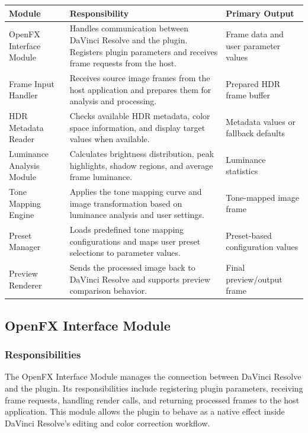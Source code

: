 \documentclass[12pt,hyphens]{article}
\begin{document}
\begin{longtable}{|p{4cm}|p{5.5cm}|p{5.5cm}|}
\hline
\textbf{Module} & \textbf{Responsibility} & \textbf{Primary Output} \\
\hline
OpenFX Interface Module & Handles communication between DaVinci Resolve and the plugin. Registers plugin parameters and receives frame requests from the host. & Frame data and user parameter values \\
\hline
Frame Input Handler & Receives source image frames from the host application and prepares them for analysis and processing. & Prepared HDR frame buffer \\
\hline
HDR Metadata Reader & Checks available HDR metadata, color space information, and display target values when available. & Metadata values or fallback defaults \\
\hline
Luminance Analysis Module & Calculates brightness distribution, peak highlights, shadow regions, and average frame luminance. & Luminance statistics \\
\hline
Tone Mapping Engine & Applies the tone mapping curve and image transformation based on luminance analysis and user settings. & Tone-mapped image frame \\
\hline
Preset Manager & Loads predefined tone mapping configurations and maps user preset selections to parameter values. & Preset-based configuration values \\
\hline
Preview Renderer & Sends the processed image back to DaVinci Resolve and supports preview comparison behavior. & Final preview/output frame \\
\hline
\end{longtable}

\subsection{OpenFX Interface Module}

\subsubsection{Responsibilities}
The OpenFX Interface Module manages the connection between DaVinci Resolve and the plugin. Its responsibilities include registering plugin parameters, receiving frame requests, handling render calls, and returning processed frames to the host application. This module allows the plugin to behave as a native effect inside DaVinci Resolve's editing and color correction workflow.
\end{document}
